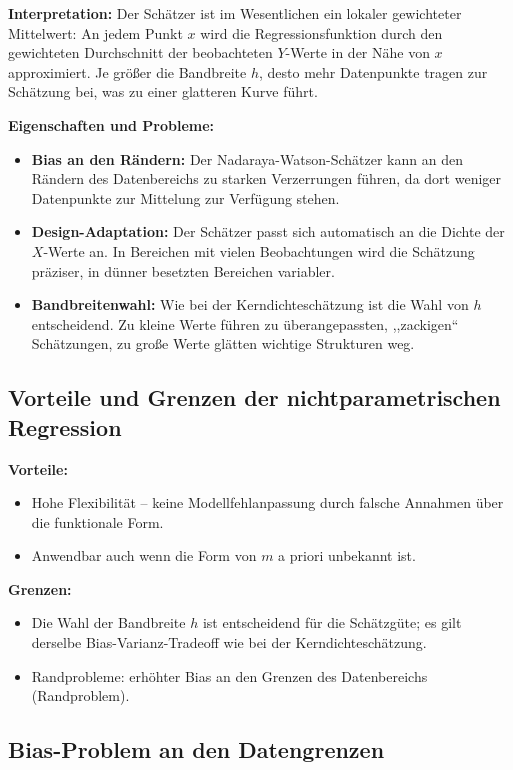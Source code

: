 \documentclass[a4paper, 11pt]{scrartcl}
\begin{document}
\textbf{Interpretation:} Der Schätzer ist im Wesentlichen ein lokaler gewichteter Mittelwert: An jedem Punkt $x$ wird die Regressionsfunktion durch den gewichteten Durchschnitt der beobachteten $Y$-Werte in der Nähe von $x$ approximiert. Je größer die Bandbreite $h$, desto mehr Datenpunkte tragen zur Schätzung bei, was zu einer glatteren Kurve führt.

\textbf{Eigenschaften und Probleme:}
\begin{itemize}
	\item \textbf{Bias an den Rändern:} Der Nadaraya-Watson-Schätzer kann an den Rändern des Datenbereichs zu starken Verzerrungen führen, da dort weniger Datenpunkte zur Mittelung zur Verfügung stehen.
	\item \textbf{Design-Adaptation:} Der Schätzer passt sich automatisch an die Dichte der $X$-Werte an. In Bereichen mit vielen Beobachtungen wird die Schätzung präziser, in dünner besetzten Bereichen variabler.
	\item \textbf{Bandbreitenwahl:} Wie bei der Kerndichteschätzung ist die Wahl von $h$ entscheidend. Zu kleine Werte führen zu überangepassten, ,,zackigen`` Schätzungen, zu große Werte glätten wichtige Strukturen weg.
\end{itemize}

\subsection{Vorteile und Grenzen der nichtparametrischen Regression}

\textbf{Vorteile:}
\begin{itemize}
	\item Hohe Flexibilität – keine Modellfehlanpassung durch falsche Annahmen über die funktionale Form.
	\item Anwendbar auch wenn die Form von $m$ a priori unbekannt ist.
\end{itemize}

\textbf{Grenzen:}
\begin{itemize}
	\item Die Wahl der Bandbreite $h$ ist entscheidend für die Schätzgüte; es gilt derselbe Bias-Varianz-Tradeoff wie bei der Kerndichteschätzung.
	\item Randprobleme: erhöhter Bias an den Grenzen des Datenbereichs (Randproblem).
\end{itemize}

\subsection{Bias-Problem an den Datengrenzen}
\end{document}
